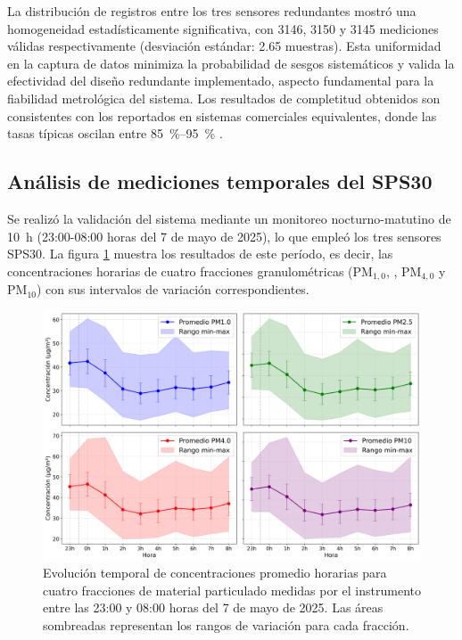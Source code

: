 La distribución de registros entre los tres sensores redundantes mostró una homogeneidad estadísticamente significativa, con \num{3146}, \num{3150} y \num{3145} mediciones válidas respectivamente (desviación estándar: \SI{2.65}{} muestras). Esta uniformidad en la captura de datos minimiza la probabilidad de sesgos sistemáticos y valida la efectividad del diseño redundante implementado, aspecto fundamental para la fiabilidad metrológica del sistema. Los resultados de completitud obtenidos son consistentes con los reportados en sistemas comerciales equivalentes, donde las tasas típicas oscilan entre \SIrange{85}{95}{\percent} \citep{Kuula2020}. 


\subsection{Análisis de mediciones temporales del SPS30}

Se realizó la validación del sistema mediante un monitoreo nocturno-matutino de \SI{10}{\hour} (23:00-08:00 horas del 7 de mayo de 2025), lo que empleó los tres sensores SPS30. La figura \ref{fig:graficohorario} muestra los resultados de este período, es decir, las concentraciones horarias de cuatro fracciones granulométricas (PM$_{1,0}$, \MPF, PM$_{4,0}$ y PM$_{10}$) con sus intervalos de variación correspondientes.

\begin{figure}[!hbp]
	\centering
	\includegraphics[width=1\linewidth]{Figures/grafico_horario}
	\caption{Evolución temporal de concentraciones promedio horarias para cuatro fracciones de material particulado medidas por el instrumento entre las 23:00 y 08:00 horas del 7 de mayo de 2025. Las áreas sombreadas representan los rangos de variación para cada fracción.}
	\label{fig:graficohorario}
\end{figure}

